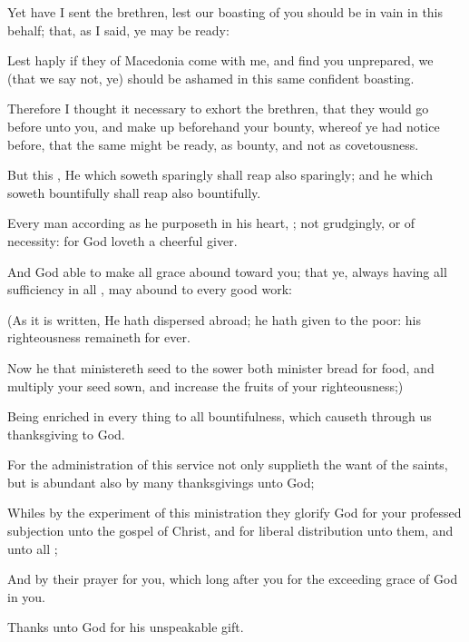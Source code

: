 {Yet have I
sent the
brethren,
lest
our
boasting
of
you should be in
vain
in
this
behalf;
that,
as I
said, ye
may
be
ready:

Lest
haply
if they of
Macedonia
come
with
me,
and
find
you
unprepared,
we (that we
say
not,
ye) should be
ashamed
in this
same
confident
boasting.

Therefore I thought
it
necessary to
exhort the
brethren,
that they would go
before
unto
you,
and make up
beforehand
your
bounty, whereof ye had notice
before, that the
same might
be
ready,
as
{}
bounty,
and
not
as
{}
covetousness.

But
this
{},
He which
soweth
sparingly shall
reap
also
sparingly;
and
he which
soweth
bountifully shall
reap
also
bountifully.

Every
man according
as he
purposeth in his
heart,
{};
not
grudgingly,
or
of
necessity:
for
God
loveth a
cheerful
giver.

And
God
{}
able to make
all
grace
abound
toward
you;
that ye,
always
having
all
sufficiency
in
all
{}, may
abound
to
every
good
work:

(As it is
written, He hath dispersed
abroad; he hath
given to the
poor:
his
righteousness
remaineth
for
ever.

Now he
that
ministereth
seed to the
sower
both
minister
bread
for
{}
food,
and
multiply
your seed
sown,
and
increase the
fruits of
your
righteousness;)

Being
enriched
in every
thing
to
all
bountifulness,
which
causeth
through
us
thanksgiving to
God.

For the
administration of
this
service
not
only
supplieth the
want of the
saints,
but
is
abundant
also
by
many
thanksgivings unto
God;

Whiles by the
experiment of
this
ministration they
glorify
God
for
your
professed
subjection
unto the
gospel of
Christ,
and for
{}
liberal
distribution
unto
them,
and
unto
all
{};

And by
their
prayer
for
you, which long
after
you
for the
exceeding
grace of
God
in
you.

Thanks
{}
unto
God
for
his
unspeakable
gift.




\par }
